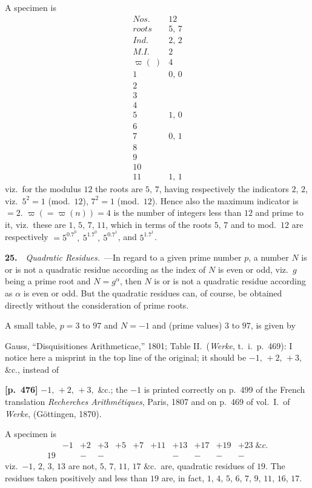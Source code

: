 \documentclass[11pt,a4paper]{article}
\providecommand{\totient}{\varpi}
\begin{document}
A specimen is
\[
\begin{array}{c|c}
\textit{Nos.}    & 12 \\
\textit{roots}   & 5,\,7 \\
\textit{Ind.}    & 2,\,2 \\
\textit{M.I.}    & 2 \\
\totient(\;)     & 4 \\\hline
 1 & 0,\,0 \\
 2 & \\
 3 & \\
 4 & \\
 5 & 1,\,0 \\
 6 & \\
 7 & 0,\,1 \\
 8 & \\
 9 & \\
10 & \\
11 & 1,\,1
\end{array}
\]
viz.\ for the modulus $12$ the roots are $5,\,7$, having respectively the indicators $2,\,2$, viz.\ $5^2=1$ (mod.\ $12$), $7^2=1$ (mod.\ $12$).   Hence also the maximum indicator is $=2$.   $\totient(=\totient(n))=4$ is the number of integers less than $12$ and prime to it, viz.\ these are $1,\,5,\,7,\,11$, which in terms of the roots $5,\,7$ and to mod.\ $12$ are respectively $=5^0.7^0,\ 5^1.7^0,\ 5^0.7^1$, and $5^1.7^1$.

\textbf{25.}\ \ \textit{Quadratic Residues.}\ ---In regard to a given prime number $p$, a number $N$ is or is not a quadratic residue according as the index of $N$ is even or odd, viz.\ $g$ being a prime root and $N=g^\alpha$, then $N$ is or is not a quadratic residue according as $\alpha$ is even or odd.   But the quadratic residues can, of course, be obtained directly without the consideration of prime roots.

A small table, $p=3$ to $97$ and $N=-1$ and (prime values) $3$ to $97$, is given by

Gauss, ``Disquisitiones Arithmeticae,'' 1801; Table II.\ (\textit{Werke}, t.~i.\ p.~469): I notice here a misprint in the top line of the original; it should be $-1,\,+2,\,+3,$ \&c., instead of

\bigskip
\noindent\textbf{[p.~476]}\quad
$-1,\,+2,\,+3,$ \&c.; the $-1$ is printed correctly on p.~499 of the French translation \textit{Recherches Arithm\'etiques}, Paris, 1807 and on p.~469 of vol.~I.\ of \textit{Werke}, (G\"ottingen, 1870).

A specimen is
\[
\begin{array}{c|cccccccccc}
   & -1 & +2 & +3 & +5 & +7 & +11 & +13 & +17 & +19 & +23\;\&c. \\\hline
19 &    & -  & -  &    &    &     & -   & -   & -   & -
\end{array}
\]
viz.\ $-1,\,2,\,3,\,13$ are not, $5,\,7,\,11,\,17$ \&c.\ are, quadratic residues of $19$.   The residues taken positively and less than $19$ are, in fact, $1,\,4,\,5,\,6,\,7,\,9,\,11,\,16,\,17$.
\end{document}
